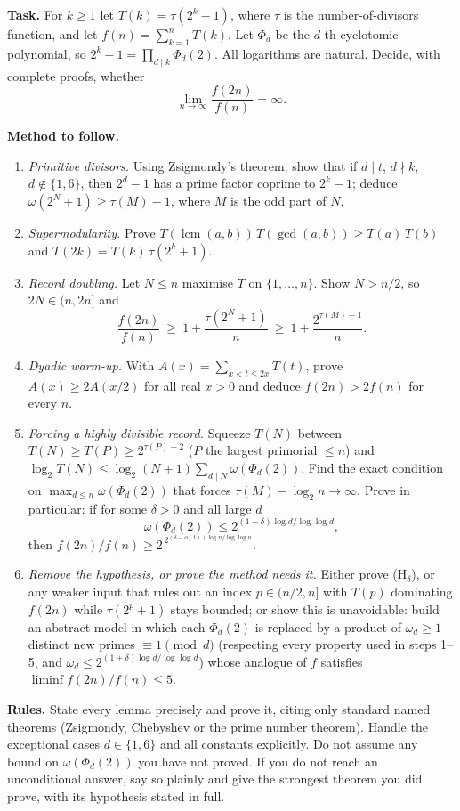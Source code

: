 \documentclass{article}
\begin{document}
\textbf{Task.} For $k\ge 1$ let $T(k)=\tau(2^k-1)$, where $\tau$ is the number-of-divisors
function, and let $f(n)=\sum_{k=1}^{n}T(k)$. Let $\Phi_d$ be the $d$-th cyclotomic polynomial,
so $2^k-1=\prod_{d\mid k}\Phi_d(2)$. All logarithms are natural. Decide, with complete proofs, whether
\[
  \lim_{n\to\infty}\frac{f(2n)}{f(n)}=\infty .
\]

\textbf{Method to follow.}
\begin{enumerate}
\item \emph{Primitive divisors.} Using Zsigmondy's theorem, show that if $d\mid t$, $d\nmid k$, $d\notin\{1,6\}$,
  then $2^d-1$ has a prime factor coprime to $2^k-1$; deduce $\omega(2^N+1)\ge\tau(M)-1$, where $M$ is the odd part of $N$.
\item \emph{Supermodularity.} Prove $T(\operatorname{lcm}(a,b))\,T(\gcd(a,b))\ge T(a)\,T(b)$ and $T(2k)=T(k)\,\tau(2^k+1)$.
\item \emph{Record doubling.} Let $N\le n$ maximise $T$ on $\{1,\dots,n\}$. Show $N>n/2$, so $2N\in(n,2n]$ and
  \[
    \frac{f(2n)}{f(n)}\ \ge\ 1+\frac{\tau(2^N+1)}{n}\ \ge\ 1+\frac{2^{\tau(M)-1}}{n}.
  \]
\item \emph{Dyadic warm-up.} With $A(x)=\sum_{x<t\le 2x}T(t)$, prove $A(x)\ge 2A(x/2)$ for all real $x>0$ and deduce
  $f(2n)>2f(n)$ for every $n$.
\item \emph{Forcing a highly divisible record.} Squeeze $T(N)$ between $T(N)\ge T(P)\ge 2^{\tau(P)-2}$ ($P$ the largest
  primorial $\le n$) and $\log_2 T(N)\le \log_2(N+1)\sum_{d\mid N}\omega(\Phi_d(2))$. Find the exact condition on
  $\max_{d\le n}\omega(\Phi_d(2))$ that forces $\tau(M)-\log_2 n\to\infty$. Prove in particular: if for some $\delta>0$
  and all large $d$
  \[
    \omega(\Phi_d(2))\le 2^{(1-\delta)\log d/\log\log d}, \tag{H$_\delta$}
  \]
  then $f(2n)/f(n)\ge 2^{\,2^{(\delta-o(1))\log n/\log\log n}}$.
\item \emph{Remove the hypothesis, or prove the method needs it.} Either prove (H$_\delta$), or any weaker input that rules
  out an index $p\in(n/2,n]$ with $T(p)$ dominating $f(2n)$ while $\tau(2^p+1)$ stays bounded; or show this is
  unavoidable: build an abstract model in which each $\Phi_d(2)$ is replaced by a product of $\omega_d\ge1$ distinct new
  primes $\equiv1\pmod d$ (respecting every property used in steps 1--5, and $\omega_d\le 2^{(1+\delta)\log d/\log\log d}$)
  whose analogue of $f$ satisfies $\liminf f(2n)/f(n)\le 5$.
\end{enumerate}

\textbf{Rules.} State every lemma precisely and prove it, citing only standard named theorems (Zsigmondy, Chebyshev or
the prime number theorem). Handle the exceptional cases $d\in\{1,6\}$ and all constants explicitly. Do not assume any
bound on $\omega(\Phi_d(2))$ you have not proved. If you do not reach an unconditional answer, say so plainly and give
the strongest theorem you did prove, with its hypothesis stated in full.
\end{document}
